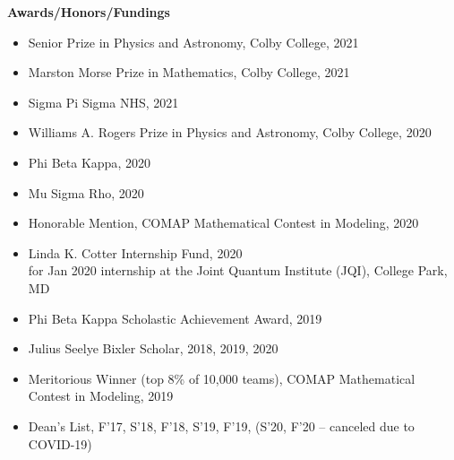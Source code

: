 \documentclass[10pt]{article}
\begin{document}
%
%
%





\noindent \large{\textbf{{Awards/Honors/Fundings}}}  \normalsize \vspace{-5pt} 
\begin{itemize}
	\setlength\itemsep{-4pt}
	\item Senior Prize in Physics and Astronomy, Colby College, {2021}
	\item Marston Morse Prize in Mathematics, Colby College, {2021}
	\item Sigma Pi Sigma NHS, {2021}
	\item {Williams A. Rogers Prize in Physics and Astronomy}, Colby College, {2020} 
	\item {Phi Beta Kappa}, {2020} 
	\item {Mu Sigma Rho}, {2020}
	\item {Honorable Mention,}  COMAP Mathematical Contest in Modeling, {2020}
	\item {Linda K. Cotter Internship Fund}, {2020}\\
	      for Jan 2020 internship at the Joint Quantum Institute (JQI), College Park, MD
	\item {Phi Beta Kappa Scholastic Achievement Award,} {2019}
	\item {Julius Seelye Bixler Scholar,} {2018, 2019, 2020}
	\item {Meritorious Winner (top 8\% of 10,000 teams),}  COMAP Mathematical Contest in Modeling, {2019}
	\item {Dean’s List}, {F'17, S'18, F'18, S'19, F'19, (S'20, F'20 -- canceled due to COVID-19)}
\end{itemize}
\end{document}

